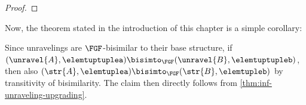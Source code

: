 \begin{proof}
\end{proof}

Now, the theorem stated in the introduction of this chapter is a simple corollary:
\thminfupgrading
\begin{proofsketch}
Since unravelings are $\FGF$-bisimilar to their base structure, if $(\unravel{A}, \elemtuptuplea) \bisimto_{\FGF} (\unravel{B}, \elemtuptupleb)$, then also $(\str{A}, \elemtuplea) \bisimto_{\FGF} (\str{B}, \elemtupleb)$ by transitivity of bisimilarity.
The claim then directly follows from \cref{thm:inf-unraveling-upgrading}.
\end{proofsketch}

